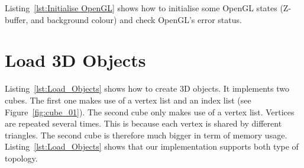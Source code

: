 \documentclass[11pt,oneside,a4paper,final]{article}
\begin{document}
Listing~\ref{lst:Initialise OpenGL} shows how to initialise some OpenGL states 
(Z-buffer, and background colour) and check OpenGL's error status. 

\begin{center}

\end{center}


\section{Load 3D Objects}
\label{sec:Load Objects}

Listing~\ref{lst:Load_Objects} shows how to create 3D objects. It 
implements 
two cubes. The first one makes use of a vertex list and an index list (see 
Figure~\ref{fig:cube_01}). The second cube only makes use of a vertex list. 
Vertices are repeated several times. This is because each vertex is shared by 
different triangles. The second cube is therefore much bigger in term of 
memory usage. Listing~\ref{lst:Load_Objects} shows that our implementation 
supports both type of topology.
\end{document}
